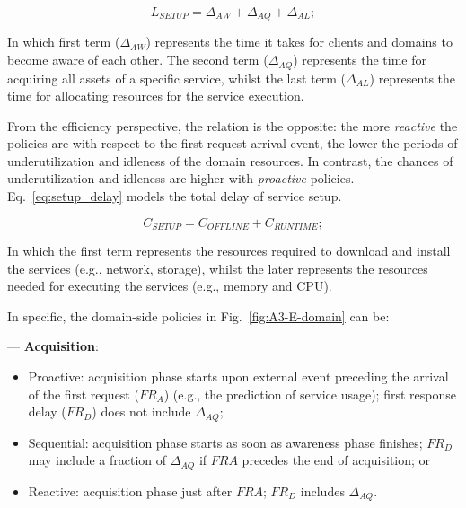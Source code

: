\begin{equation}\label{eq:setup_delay}
L_{SETUP} = \Delta_{AW} + \Delta_{AQ} + \Delta_{AL};
\end{equation}


\noindent
In which first term ($\Delta_{AW}$) represents the time it takes for clients and domains to become aware of each other. The second term ($\Delta_{AQ}$) represents the time for acquiring all assets of a specific service, whilst the last term ($\Delta_{AL}$) represents the time for allocating resources for the service execution. 

From the efficiency perspective, the relation is the opposite: the more \textit{reactive} the policies are with respect to the first request arrival event, the lower the periods of underutilization and idleness of the domain resources. In contrast, the chances of underutilization and idleness are higher with \textit{proactive} policies. Eq.~\ref{eq:setup_delay} models the total delay of service setup. 

\begin{equation}\label{eq:setup_cost}
C_{SETUP} = C_{OFFLINE} + C_{RUNTIME};
\end{equation}

\noindent
In which the first term represents the resources required to download and install the services (e.g., network, storage), whilst the later represents the resources needed for executing the services (e.g., memory and CPU).

In specific, the domain-side policies in Fig.~\ref{fig:A3-E-domain} can be:
\medskip
\medskip


--- \textbf{Acquisition}:

\begin{itemize}

\item Proactive: acquisition phase starts upon external event preceding the arrival of the first request ($FR_A$) (e.g., the prediction of service usage); first response delay ($FR_D$) does not include $\Delta_{AQ}$;

\item Sequential: acquisition phase starts as soon as awareness phase finishes; $FR_D$ may include a fraction of $\Delta_{AQ}$ if $FRA$ precedes the end of acquisition; or

\item Reactive: acquisition phase just after $FRA$; $FR_D$ includes $\Delta_{AQ}$.

\end{itemize}

